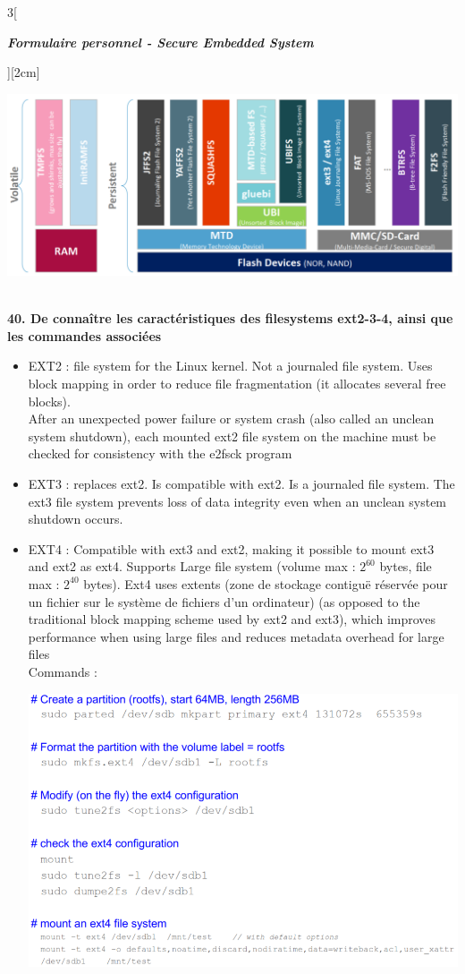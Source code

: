 \begin{multicols}{3}[\centerline{ \large\em \textbf{Formulaire personnel - Secure Embedded System}}][2cm]
\begin{minipage}{\linewidth}
	\centering
    \includegraphics[width =\columnwidth]{images/25.png}
\end{minipage}
\\ \textbf{40. De connaître les caractéristiques des filesystems ext2-3-4, ainsi que les commandes associées}
 \begin{itemize}
 \item EXT2 :  file system for the Linux kernel. Not a journaled file system. Uses block mapping in order to reduce file fragmentation (it allocates several free blocks).\\
 After an unexpected power failure or system crash (also called an
unclean system shutdown), each mounted ext2 file system on the
machine must be checked for consistency with the e2fsck program
 \item EXT3 : replaces ext2. Is compatible with ext2. Is a journaled file system. The ext3 file system prevents loss of data integrity even when an unclean system shutdown occurs.
 \item EXT4 : Compatible with ext3 and ext2, making it possible to
mount ext3 and ext2 as ext4. Supports Large file system (volume max : $2^{60}$ bytes, file max : $2^{40}$ bytes). Ext4 uses extents (zone de stockage contiguë réservée pour un fichier sur le système de fichiers d'un ordinateur) (as opposed to the traditional block mapping scheme used by ext2 and ext3), which improves performance when using large files and reduces metadata overhead for large files\\
Commands :\\
\begin{minipage}{\linewidth}
	\centering
    \includegraphics[width =0.6\columnwidth]{images/26.png}

\end{minipage}
\end{itemize}
\end{multicols}
